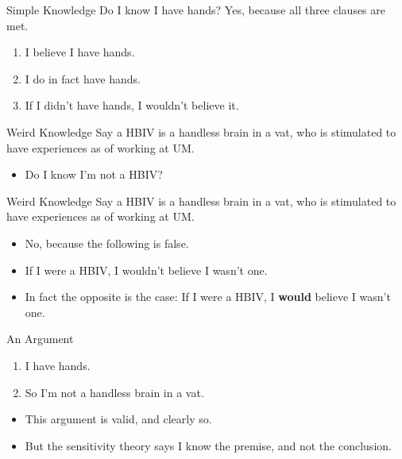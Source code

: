 \documentclass[
  17pt,
  letterpaper,
  ignorenonframetext,
  aspectratio=169,
  handout]{beamer}
\providecommand{\tightlist}{%
  \setlength{\itemsep}{0pt}\setlength{\parskip}{0pt}}\usepackage{longtable,booktabs,array}
\begin{document}
\begin{frame}{Simple Knowledge}
\protect\hypertarget{simple-knowledge}{}
Do I know I have hands? Yes, because all three clauses are met.

\begin{enumerate}[<+->]
\tightlist
\item
  I believe I have hands.
\item
  I do in fact have hands.
\item
  If I didn't have hands, I wouldn't believe it.
\end{enumerate}
\end{frame}

\begin{frame}{Weird Knowledge}
\protect\hypertarget{weird-knowledge}{}
Say a HBIV is a handless brain in a vat, who is stimulated to have
experiences as of working at UM.

\begin{itemize}[<+->]
\tightlist
\item
  Do I know I'm not a HBIV?
\end{itemize}
\end{frame}

\begin{frame}{Weird Knowledge}
\protect\hypertarget{weird-knowledge-1}{}
Say a HBIV is a handless brain in a vat, who is stimulated to have
experiences as of working at UM.

\begin{itemize}[<+->]
\tightlist
\item
  No, because the following is false.
\item
  If I were a HBIV, I wouldn't believe I wasn't one.
\item
  In fact the opposite is the case: If I were a HBIV, I \textbf{would}
  believe I wasn't one.
\end{itemize}
\end{frame}

\begin{frame}{An Argument}
\protect\hypertarget{an-argument}{}
\begin{enumerate}[<+->]
\tightlist
\item
  I have hands.
\item
  So I'm not a handless brain in a vat.
\end{enumerate}

\begin{itemize}[<+->]
\tightlist
\item
  This argument is valid, and clearly so.
\item
  But the sensitivity theory says I know the premise, and not the
  conclusion.
\end{itemize}
\end{frame}
\end{document}
